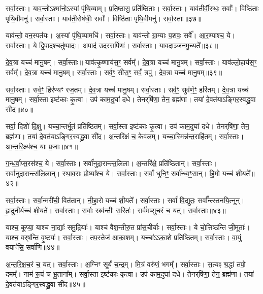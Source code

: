    सर्वा॒स्ताः।
   याव॒न्तोऽश्मा॑नो॒ऽस्यां पृ॑थि॒व्याम्।
   प्र॒ति॒ष्ठासु॒ प्रति॑ष्ठिताः।
   सर्वा॒स्ताः।
   याव॑तीर्वी॒रुधः॒ सर्वाः᳚।
   विष्ठि॑ताः पृथि॒वीमनु॑।
   सर्वा॒स्ताः।
   याव॑ती॒रोष॑धीः॒ सर्वाः᳚।
   विष्ठि॑ताः पृथि॒वीमनु॑।
   सर्वा॒स्ताः॥३७॥

   याव॑न्तो॒ वन॒स्पत॑यः।
   अ॒स्यां पृ॑थि॒व्यामधि॑।
   सर्वा॒स्ताः।
   याव॑न्तो ग्रा॒म्याः प॒शवः॒ सर्वे᳚।
   आ॒र॒ण्याश्च॒ ये।
   सर्वा॒स्ताः।
   ये द्वि॒पाद॒श्चतु॑ष्पादः।
   अ॒पाद॑ उदरस॒र्पिणः॑।
   सर्वा॒स्ताः।
   याव॒दाञ्ज॑नमु॒च्यते᳚॥३८॥

   दे॒व॒त्रा यच्च॑ मानु॒षम्।
   सर्वा॒स्ताः॥
   याव॑त्कृ॒ष्णाय॑स॒ꣳ॒ सर्वम्᳚।
   दे॒व॒त्रा यच्च॑ मानु॒षम्।
   सर्वा॒स्ताः।
   याव॑ल्लो॒हाय॑स॒ꣳ॒ सर्वम्᳚।
   दे॒व॒त्रा यच्च॑ मानु॒षम्।
   सर्वा॒स्ताः।
   सर्व॒ꣳ॒ सीस॒ꣳ॒ सर्वं॒ त्रपु॑।
   दे॒व॒त्रा यच्च॑ मानु॒षम्॥३९॥

   सर्वा॒स्ताः।
   सर्व॒ꣳ॒ हिर॑ण्यꣳ रज॒तम्।
   दे॒व॒त्रा यच्च॑ मानु॒षम्।
   सर्वा॒स्ताः।
   सर्व॒ꣳ॒ सुव॑र्ण॒ꣳ॒ हरि॑तम्।
   दे॒व॒त्रा यच्च॑ मानु॒षम्।
   सर्वा॒स्ता इष्ट॑काः कृ॒त्वा।
   उप॑ काम॒दुघा॑ दधे।
   तेनर्‌षि॑णा॒ तेन॒ ब्रह्म॑णा।
   तया॑ दे॒वत॑याऽङ्गिर॒स्वद्ध्रु॒वा सी॑द॥४०॥
   \anuvakamend
  
   सर्वा॒ दिशो॑ दि॒क्षु।
   यच्चा॒न्तर्भू॒तं प्रति॑ष्ठितम्।
   सर्वा॒स्ता इष्ट॑काः कृ॒त्वा।
   उप॑ काम॒दुघा॑ दधे।
   तेनर्‌षि॑णा॒ तेन॒ ब्रह्म॑णा।
   तया॑ दे॒वत॑याऽङ्गिर॒स्वद्ध्रु॒वा सी॑द।
   अ॒न्तरि॑क्षं च॒ केव॑लम्।
   यच्चा॒स्मिन्न॑न्त॒राहि॑तम्।
   सर्वा॒स्ताः।
   आ॒न्त॒रि॒क्ष्य॑श्च॒ याः प्र॒जाः॥४१॥

   ग॒न्ध॒र्वा॒प्स॒रस॑श्च॒ ये।
   सर्वा॒स्ताः।
   सर्वा॑नुदा॒रान्त्स॒लिला\sn{}।
   अ॒न्तरि॑क्षे॒ प्रति॑ष्ठितान्।
   सर्वा॒स्ताः।
   सर्वा॑नुदा॒रान्त्स॑लि॒लान्।
   स्था॒व॒राः प्रो॒ष्या᳚श्च॒ ये।
   सर्वा॒स्ताः।
   सर्वां॒ धुनि॒ꣳ॒ सर्वा᳚न्ध्व॒ꣳ॒सान्।
   हि॒मो यच्च॑ शी॒यते᳚॥४२॥

   सर्वा॒स्ताः।
   सर्वा॒न्मरी॑ची॒\an{} वित॑तान्।
   नी॒हा॒रो यच्च॑ शी॒यते᳚।
   सर्वा॒स्ताः।
   सर्वा॑ वि॒द्युतः॒ सर्वा᳚न्त्स्तनयि॒त्नून्।
   ह्रा॒दुनी॒र्यच्च॑ शी॒यते᳚।
   सर्वा॒स्ताः।
   सर्वाः॒ स्रव॑न्तीः स॒रितः॑।
   सर्व॑मप्सुच॒रं च॒ यत्।
   सर्वा॒स्ताः॥४३॥

   याश्च॒ कूप्या॒ याश्च॑ ना॒द्याः᳚ समु॒द्रियाः᳚।
   याश्च॑ वैश॒न्तीरु॒त प्रा॑स॒चीर्याः।
   सर्वा॒स्ताः।
   ये चो॒त्तिष्ठ॑न्ति जी॒मूताः᳚।
   याश्च॒ वर्‌ष॑न्ति वृ॒ष्टयः॑।
   सर्वा॒स्ताः।
   तप॒स्तेज॑ आका॒शम्।
   यच्चा॑ऽऽका॒शे प्रति॑ष्ठितम्।
   सर्वा॒स्ताः।
   वा॒युं वयाꣳ॑सि॒ सर्वा॑णि॥४४॥

   अ॒न्त॒रि॒क्ष॒च॒रं च॒ यत्।
   सर्वा॒स्ताः।
   अ॒ग्निꣳ सूर्यं॑ च॒न्द्रम्।
   मि॒त्रं वरु॑णं॒ भगम्᳚।
   सर्वा॒स्ताः।
   स॒त्यꣴ श्र॒द्धां तपो॒ दमम्᳚।
   नाम॑ रू॒पं च॑ भू॒ताना᳚म्।
   सर्वा॒स्ता इष्ट॑काः कृ॒त्वा।
   उप॑ काम॒दुघा॑ दधे।
   तेनर्‌षि॑णा॒ तेन॒ ब्रह्म॑णा।
   तया॑ दे॒वत॑याऽङ्गिर॒स्वद्ध्रु॒वा सी॑द॥४५॥
\anuvakamend
  
